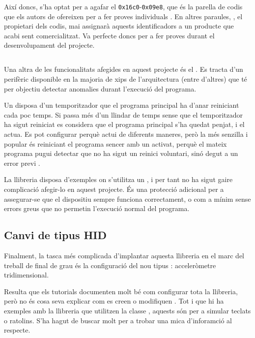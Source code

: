 Així doncs, s'ha optat per a agafar el 
\texttt{0x16c0}-\texttt{0x09e8}, que és la
parella de codis que els autors de  ofereixen per a fer proves
individuals \cite{Vusb}. En altres paraules, , el propietari dels
codis, mai assignarà aquests identificadors a un producte que acabi sent
comercialitzat. Va perfecte doncs per a fer proves durant el desenvolupament del
projecte.

\subsection{}

Una altra de les funcionalitats afegides en aquest projecte és el .
Es tracta d'un perifèric disponible en la majoria de xips de l'arquitectura
 (entre d'altres) que té per objectiu detectar anomalies durant
l'execució del programa.

Un  disposa d'un temporitzador que el programa principal ha d'anar
reiniciant cada poc temps. Si passa més d'un llindar de temps sense que el
temporitzador ha sigut reiniciat es considera que el programa principal s'ha
quedat penjat, i el  actua. Es pot configurar perquè actui de
diferents maneres, però la més senzilla i popular és reiniciant el programa
sencer amb un  activat, perquè el mateix programa pugui detectar que
no ha sigut un reinici voluntari, sinó degut a un error previ \cite{Watchdog}.

La llibreria  disposa d'exemples on s'utilitza un , i
per tant no ha sigut gaire complicació afegir-lo en aquest projecte. És una
protecció adicional per a assegurar-se que el dispositiu sempre funciona
correctament, o com a mínim sense errors greus que no permetin l'execució
normal del programa.

\subsection{Canvi de tipus HID}

Finalment, la tasca més complicada d'implantar aquesta llibreria en el marc
del treball de final de grau és la configuració del nou tipus :
acceleròmetre tridimensional.

Resulta que els tutorials documenten molt bé com configurar tota la llibreria,
però no és cosa seva explicar com es creen o modifiquen .
Tot i que hi ha exemples amb la llibreria que utilitzen la classe ,
aquests són per a simular teclats o ratolins. S'ha hagut de buscar molt per a
trobar una mica d'inforamció al respecte.


